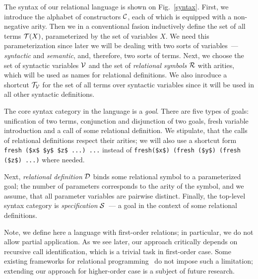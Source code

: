 The syntax of our relational language is shown on Fig.~\ref{syntax}. First, we introduce the alphabet of constructors ${\cal{C}}$, each of which is equipped with a 
non-negative arity. Then we in a conventional fasion inductively define the set of all terms ${\cal{T}}(X)$, parameterized by the set of variables $X$. We need this parameterization 
since later we will be dealing with two sorts of variables~--- \emph{syntactic} and \emph{semantic}, and, therefore, two sorts of terms. Next, we choose the set of syntactic variables
${\cal{V}}$ and the set of \emph{relational symbols} ${\cal{R}}$ with arities, which will be used as names for relational definitions. We also inroduce a shortcut
${\cal{T_V}}$ for the set of all terms over syntactic variables since it will be used in all other syntactic definitions.

The core syntax category in the language is a \emph{goal}. There are five types of goals: unification of two terms, conjunction and disjunction of two
goals, fresh variable introduction and a call of some relational definition. We stipulate, that the calls of relational definitions respect their arities; we 
will also use a shortcut form \lstinline|fresh ($x$ $y$ $z$ ...) ...| instead of \lstinline|fresh($x$) (fresh ($y$) (fresh ($z$) ...)| where needed.

Next, \emph{relational definition} ${\cal{D}}$ binds some relational symbol to a parameterized goal; the number of parameters corresponds to the arity of the symbol, and
we assume, that all parameter variables are pairwise distinct. Finally, the top-level syntax category is \emph{specification} ${\cal{S}}$~--- a goal in the context 
of some relational definitions. 

Note, we define here a language with first-order relations; in particular, we do not allow partial application. As we see later, our approach critically depends
on recursive call identification, which is a trivial task in first-order case. Some existing frameworks for relational programming~\cite{OCanren,RelConversion}
do not impose such a limitation; extending our approach for higher-order case is a subject of future research.

\setarrow{\xRightarrow}
\newcommand{\otrans}[4]{\withenv{#1}{\trans{#2}{\mbox{$#3$}}{#4}}}
\newcommand{\cotrans}[5]{\withenv{#1}{\ctrans{#2}{\mbox{$#3$}}{#4}{#5}}}
 
